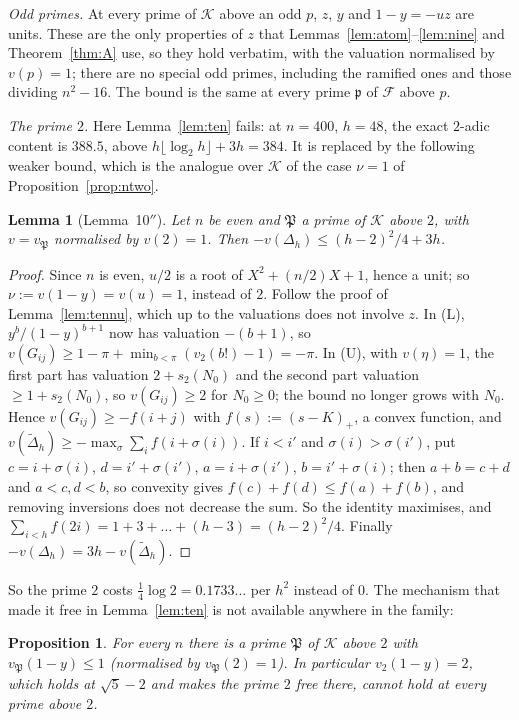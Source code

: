 \documentclass[11pt]{amsart}
\newtheorem{proposition}[theorem]{Proposition}
\newtheorem{lemma}[theorem]{Lemma}
\theoremstyle{definition}
\theoremstyle{remark}
\numberwithin{equation}{section}
\newcommand{\cK}{\mathcal{K}}
\newcommand{\cF}{\mathcal{F}}
\newcommand{\fp}{\mathfrak{p}}
\newcommand{\fP}{\mathfrak{P}}
\begin{document}
\emph{Odd primes.} At every prime of $\cK$ above an odd $p$, $z$, $y$ and $1-y=-uz$ are units. These are the only
properties of $z$ that Lemmas~\ref{lem:atom}--\ref{lem:nine} and Theorem~\ref{thm:A} use, so they hold verbatim, with the
valuation normalised by $v(p)=1$; there are no special odd primes, including the ramified ones and those dividing
$n^2-16$. The bound is the same at every prime $\fp$ of $\cF$ above $p$.

\emph{The prime $2$.} Here Lemma~\ref{lem:ten} fails: at $n=400$, $h=48$, the exact $2$-adic content is $388.5$, above
$h\lfloor\log_2h\rfloor+3h=384$. It is replaced by the following weaker bound, which is the analogue over $\cK$ of the
case $\nu=1$ of Proposition~\ref{prop:ntwo}.

\begin{lemma}[Lemma~10$''$]\label{lem:tenpp}
Let $n$ be even and $\fP$ a prime of $\cK$ above $2$, with $v=v_\fP$ normalised by $v(2)=1$. Then
$-v(\Delta_h)\le(h-2)^2/4+3h$.
\end{lemma}

\begin{proof}
Since $n$ is even, $u/2$ is a root of $X^2+(n/2)X+1$, hence a unit; so
$\nu:=v(1-y)=v(u)=1$, instead of $2$. Follow the proof of Lemma~\ref{lem:tennu}, which up to the valuations does not
involve $z$. In (L), $y^b/(1-y)^{b+1}$ now has valuation $-(b+1)$, so
$v(G_{ij})\ge1-\pi+\min_{b<\pi}(v_2(b!)-1)=-\pi$. In (U), with $v(\eta)=1$, the first part has valuation $2+s_2(N_0)$ and
the second part valuation $\ge1+s_2(N_0)$, so $v(G_{ij})\ge2$ for $N_0\ge0$; the bound no longer grows with $N_0$. Hence
$v(G_{ij})\ge-f(i+j)$ with $f(s):=(s-K)_+$, a convex function, and $v(\tilde\Delta_h)\ge-\max_\sigma\sum_if(i+\sigma(i))$.
If $i<i'$ and $\sigma(i)>\sigma(i')$, put $c=i+\sigma(i)$, $d=i'+\sigma(i')$, $a=i+\sigma(i')$, $b=i'+\sigma(i)$; then
$a+b=c+d$ and $a<c,d<b$, so convexity gives $f(c)+f(d)\le f(a)+f(b)$, and removing inversions does not decrease the sum.
So the identity maximises, and $\sum_{i<h}f(2i)=1+3+\dots+(h-3)=(h-2)^2/4$. Finally $-v(\Delta_h)=3h-v(\tilde\Delta_h)$.
\end{proof}

So the prime $2$ costs $\frac14\log2=0.1733\ldots$ per $h^2$ instead of $0$. The mechanism that made it free in
Lemma~\ref{lem:ten} is not available anywhere in the family:

\begin{proposition}\label{prop:nu}
For every $n$ there is a prime $\fP$ of $\cK$ above $2$ with $v_\fP(1-y)\le1$ (normalised by $v_\fP(2)=1$). In particular
$v_2(1-y)=2$, which holds at $\sqrt5-2$ and makes the prime $2$ free there, cannot hold at every prime above $2$.
\end{proposition}
\end{document}
